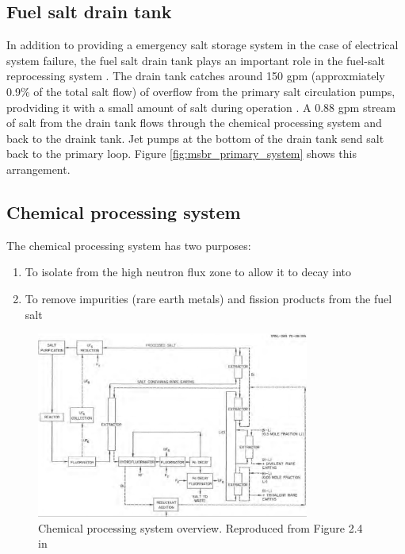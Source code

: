 \subsection{Fuel salt drain tank}
In addition to providing a emergency salt storage system in the case of
electrical system failure, the fuel salt drain tank plays an important role in
the fuel-salt reprocessing system \cite{robertson_conceptual_1971}. The drain tank catches around 150 gpm (approxmiately 0.9\% of the total salt flow) of
overflow from the primary salt circulation pumps, prodviding it with a small
amount of salt during operation \cite{robertson_conceptual_1971}. A 0.88 gpm
stream of salt from the drain tank flows through the chemical processing system
and back to the draink tank. Jet pumps at the bottom of the drain tank send salt
back to the primary loop. Figure \ref{fig:msbr_primary_system} shows this
arrangement.

\subsection{Chemical processing system}
The chemical processing system has two purposes:
\begin{enumerate}
    \item To isolate  from the high neutron flux zone to allow it to decay into 
    \item To remove impurities (rare earth metals) and fission products from the fuel salt
\end{enumerate}

\begin{figure}[htpb]
    \centering
    \includegraphics[width=0.8\textwidth]{figs/ch4/chemical_processing_system.png}
    \caption{Chemical processing system overview. Reproduced from Figure 2.4 in \cite{robertson_conceptual_1971}}
    \label{fig:}
\end{figure}

